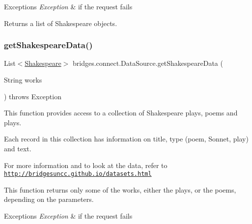 \begin{DoxyExceptions}{Exceptions}
{\em Exception} & if the request fails\\
\hline
\end{DoxyExceptions}
\begin{DoxyReturn}{Returns}
a list of Shakespeare objects. 
\end{DoxyReturn}
\mbox{\label{classbridges_1_1connect_1_1_data_source_a04aa757c45139e52525d4b09156abfe1}} 
\subsubsection{\texorpdfstring{get\+Shakespeare\+Data()}{getShakespeareData()}\hspace{0.1cm}{\footnotesize\ttfamily [2/3]}}
{\footnotesize\ttfamily List$<$\hyperlink{classbridges_1_1data__src__dependent_1_1_shakespeare}{Shakespeare}$>$ bridges.\+connect.\+Data\+Source.\+get\+Shakespeare\+Data (\begin{DoxyParamCaption}\item[{String}]{works }\end{DoxyParamCaption}) throws Exception}



This function provides access to a collection of Shakespeare plays, poems and plays. 

Each record in this collection has information on title, type (poem, Sonnet, play) and text.

For more information and to look at the data, refer to \href{http://bridgesuncc.github.io/datasets.html}{\tt http\+://bridgesuncc.\+github.\+io/datasets.\+html}

This function returns only some of the works, either the plays, or the poems, depending on the parameters.


\begin{DoxyExceptions}{Exceptions}
{\em Exception} & if the request fails\\
\hline
\end{DoxyExceptions}

